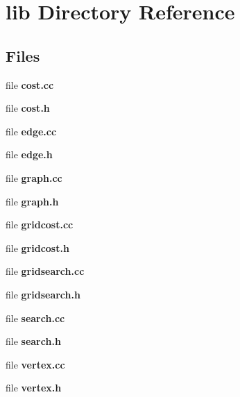 \section{lib Directory Reference}
\label{dir_97aefd0d527b934f1d99a682da8fe6a9}
\subsection*{Files}
\begin{DoxyCompactItemize}
\item 
file {\bf cost.\-cc}
\item 
file {\bf cost.\-h}
\item 
file {\bf edge.\-cc}
\item 
file {\bf edge.\-h}
\item 
file {\bf graph.\-cc}
\item 
file {\bf graph.\-h}
\item 
file {\bf gridcost.\-cc}
\item 
file {\bf gridcost.\-h}
\item 
file {\bf gridsearch.\-cc}
\item 
file {\bf gridsearch.\-h}
\item 
file {\bf search.\-cc}
\item 
file {\bf search.\-h}
\item 
file {\bf vertex.\-cc}
\item 
file {\bf vertex.\-h}
\end{DoxyCompactItemize}
